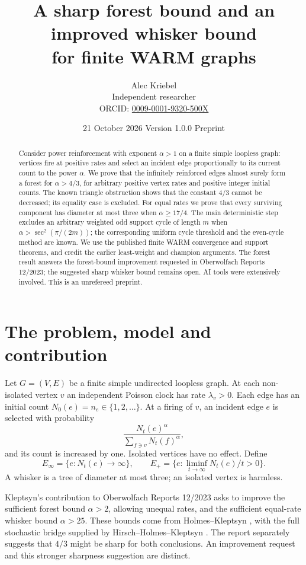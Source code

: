 \documentclass[11pt]{article}
\title{A sharp forest bound and an improved whisker bound\protect\\for finite WARM graphs}
\author{Alec Kriebel\\\small Independent researcher\\
\small ORCID: \href{https://orcid.org/0009-0001-9320-500X}{0009-0001-9320-500X}}
\date{21 October 2026 \quad Version 1.0.0 \quad Preprint}
\begin{document}
\maketitle
\begin{abstract}
Consider power reinforcement with exponent $\alpha>1$ on a finite simple
loopless graph: vertices fire at positive rates and select an incident edge
proportionally to its current count to the power $\alpha$.
We prove that the infinitely reinforced edges almost surely form a forest
for $\alpha>4/3$, for arbitrary positive vertex rates and positive integer
initial counts. The known triangle obstruction shows that the constant
$4/3$ cannot be decreased; its equality case is excluded.
For equal rates we prove that every surviving component has diameter at
most three when $\alpha\ge17/4$.
The main deterministic step excludes an arbitrary weighted odd support
cycle of length $m$ when $\alpha>\sec^2(\pi/(2m))$; the corresponding uniform
cycle threshold and the even-cycle method are known.
We use the published finite WARM convergence and support theorems, and
credit the earlier least-weight and champion arguments.
The forest result answers the forest-bound improvement requested in
Oberwolfach Reports 12/2023; the suggested sharp whisker bound remains open.
AI tools were extensively involved. This is an unrefereed preprint.
\end{abstract}

\section{The problem, model and contribution}
Let $G=(V,E)$ be a finite simple undirected loopless graph. At each
non-isolated vertex $v$ an independent Poisson clock has rate
$\lambda_v>0$. Each edge has an initial count $N_0(e)=n_e\in\{1,2,\ldots\}$.
At a firing of $v$, an incident edge $e$ is selected with probability
\[
 \frac{N_t(e)^\alpha}{\sum_{f\ni v}N_t(f)^\alpha},
\]
and its count is increased by one. Isolated vertices have no effect.
Define
\[
 E_\infty=\{e:N_t(e)\longrightarrow\infty\},\qquad
 E_+=\{e:\liminf_{t\to\infty}N_t(e)/t>0\}.
\]
A whisker is a tree of diameter at most three; an isolated vertex is harmless.

Kleptsyn's contribution to Oberwolfach Reports 12/2023
\cite[printed pp.~653--655]{OWR} asks to improve the sufficient forest
bound $\alpha>2$, allowing unequal rates, and the sufficient equal-rate
whisker bound $\alpha>25$. These bounds come from Holmes--Kleptsyn
\cite{HK}, with the full stochastic bridge supplied by
Hirsch--Holmes--Kleptsyn \cite{HHK}. The report separately suggests that
$4/3$ might be sharp for both conclusions. An improvement request and
this stronger sharpness suggestion are distinct.
\end{document}
